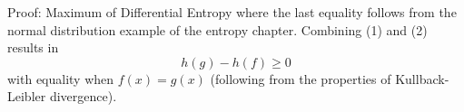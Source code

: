 \begin{vbframe}{Proof: Maximum of Differential Entropy}
where the last equality follows from the normal distribution example of the entropy chapter. Combining (1) and (2) results in
$$h(g) - h(f) \geq 0$$
with equality when $f(x) = g(x)$ (following from the properties of Kullback-Leibler divergence).
\end{vbframe}



\endlecture

